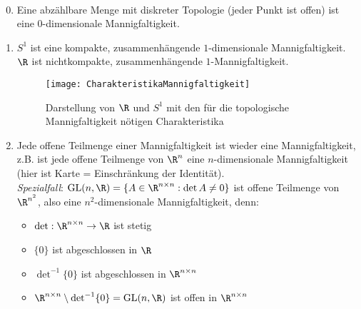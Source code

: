 \begin{example}
  \
  \begin{enumerate}
    \setcounter{enumi}{-1}

    \item Eine abzählbare Menge mit diskreter Topologie (jeder Punkt ist offen) ist eine \( 0 \)-dimensionale Mannigfaltigkeit.

    \item \( S^1 \) ist eine kompakte, zusammenhängende \( 1 \)-dimensionale Mannigfaltigkeit. \\
      \( \R \) ist nichtkompakte, zusammenhängende \( 1 \)-Mannigfaltigkeit.

    \begin{figure}[H]
      \texttt{[image: CharakteristikaMannigfaltigkeit]}
      \captionsetup{width=.5\textwidth}
      \caption{Darstellung von \( \R \) und \( S^1 \) mit den für die topologische Mannigfaltigkeit nötigen Charakteristika}
    \end{figure}

    \item Jede offene Teilmenge einer Mannigfaltigkeit ist wieder eine Mannigfaltigkeit, z.B. ist jede offene Teilmenge von \( \R^n \) eine \( n \)-dimensionale Mannigfaltigkeit (hier ist Karte = Einschränkung der Identität). \\
    \emph{Spezialfall}: \( \text{GL}(n,\R) = \{ A \in \R^{n \times n} : \det A \neq 0 \} \) ist offene Teilmenge von \( \R^{n^2} \), also eine \( n^2 \)-dimensionale Mannigfaltigkeit, denn:
    \begin{itemize}
      \item \( \det : \R^{n \times n} \to \R \) ist stetig
      \item \( \{ 0 \} \) ist abgeschlossen in \( \R \)
      \item \( \det^{-1} \{ 0 \} \) ist abgeschlossen in \( \R^{n \times n} \)
      \item \( \R^{n \times n} \setminus \det^{-1} \{ 0 \} = \text{GL}(n,\R ) \) ist offen in \( \R^{n \times n} \)
    \end{itemize}


\end{enumerate}
\end{example}
